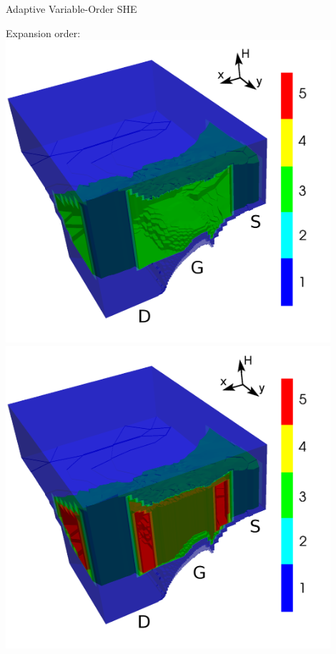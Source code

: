 \documentclass[usepdftitle=false,10pt]{beamer}
\begin{document}
\begin{frame}{Adaptive Variable-Order SHE}
{\begin{minipage}{0.4\textwidth}
\begin{center}
  \end{center}
  \end{minipage}
  \hspace{0.5cm}
  \begin{minipage}{0.4\textwidth}
  \begin{center} Expansion order:\\
    \includegraphics[width=0.9\textwidth]{mosfet-order-1} \\
    \includegraphics[width=0.9\textwidth]{mosfet-order-3}
  \end{center}  
  \end{minipage}
  \hspace{2.5cm}
 } %

\end{frame}
\end{document}
